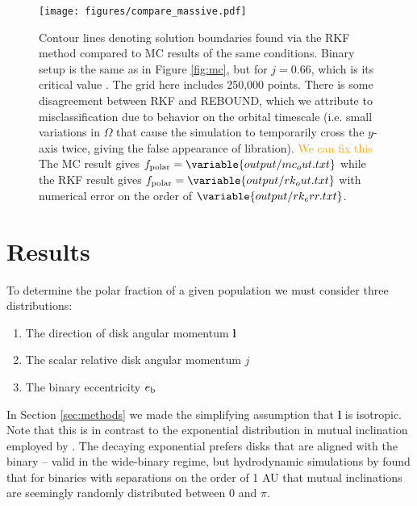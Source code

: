 \documentclass[twocolumn]{aastex631}
\newcommand{\TJ}[1]{\textcolor{orange}{#1}}
\begin{document}
\begin{figure}
    \begin{centering}
        \texttt{[image: figures/compare\_massive.pdf]}
        \caption{
            Contour lines denoting solution boundaries found via the RKF method compared to MC results of the same conditions. Binary setup is the same
            as in Figure \ref{fig:mc}, but for $j=0.66$, which is its critical value \citep[see][]{martin2019,abod2022}. The grid here includes 250,000 points.
            There is some disagreement between RKF and {\sc REBOUND}, which we attribute to misclassification due to behavior on the orbital timescale (i.e. 
            small variations in $\Omega$ that cause the simulation to temporarily cross the $y$-axis twice, giving the false appearance of libration). \TJ{We can fix this}
            The MC result gives $f_{\text{polar}} = \variable{output/mc_out.txt}$ while the RKF result gives $f_{\text{polar}} = \variable{output/rk_out.txt}$ with
            numerical error on the order of $\variable{output/rk_err.txt}$.
        }
        \label{fig:rkf}
    \end{centering}
\end{figure}


\section{Results}
\label{sec:results}

To determine the polar fraction of a given population we must consider three distributions:
\begin{enumerate}
    \item The direction of disk angular momentum $\bm{l}$ \label{it:l} \\
    \item The scalar relative disk angular momentum $j$ \label{it:j} \\
    \item The binary eccentricity $e_{\rm b}$ \label{it:eb}
\end{enumerate}

In Section \ref{sec:methods} we made the simplifying assumption that $\bm{l}$ is isotropic. Note that this is in contrast to the exponential distribution in
mutual inclination employed by \citet{ceppi2024}. The decaying exponential prefers disks that are aligned with the binary -- valid in the wide-binary regime, but
hydrodynamic simulations by \citep{elsender2023} found that for binaries with separations on the order of 1 AU that mutual inclinations are seemingly randomly
distributed between $0$ and $\pi$. %
\end{document}
